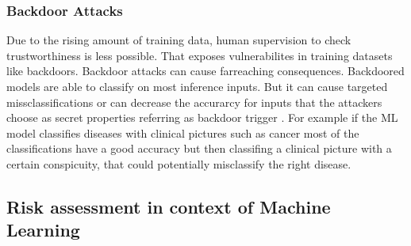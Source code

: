 \subsubsection*{Backdoor Attacks}
\label{sec:backdoor}
Due to the rising amount of training data, human supervision to check trustworthiness is less possible. That exposes vulnerabilites in training datasets like backdoors. Backdoor attacks
can cause farreaching consequences. Backdoored models are able to classify on most inference inputs. But it can cause targeted missclassifications or can decrease the accurarcy for inputs
that the attackers choose as secret properties referring as backdoor trigger \cite{DBLP:journals/corr/abs-1708-06733}. For example if the ML model classifies diseases with clinical
pictures such as cancer most of the classifications  have a good accuracy but then classifing a clinical picture with a certain conspicuity, that could potentially misclassify the right
disease.

\subsection{Risk assessment in context of Machine Learning}

